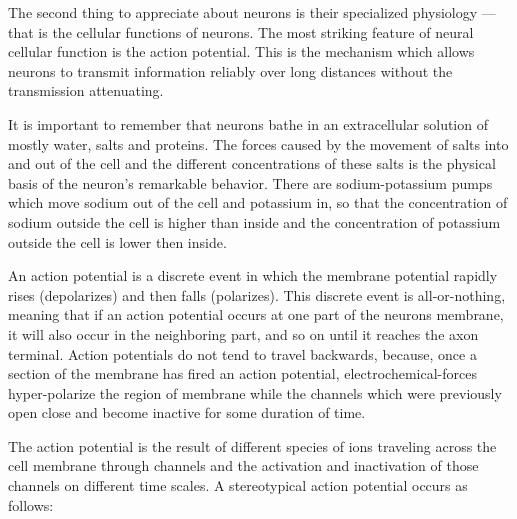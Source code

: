 \documentclass[12pt,a4paper]{report}
\begin{document}
The second thing to appreciate about neurons is their specialized physiology — that is the cellular functions of neurons. The most striking feature of neural cellular function is the action potential. This is the mechanism which allows neurons to transmit information reliably over long distances without the transmission attenuating.

\vspace{10pt}
It is important to remember that neurons bathe in an extracellular solution of mostly water, salts and proteins. The forces caused by the movement of salts into and out of the cell and the different concentrations of these salts is the physical basis of the neuron’s remarkable behavior. There are sodium-potassium pumps which move sodium out of the cell and potassium in, so that the concentration of sodium outside the cell is higher than inside and the concentration of potassium outside the cell is lower then inside.

\vspace{10pt}
An action potential is a discrete event in which the membrane potential rapidly rises (depolarizes) and then falls (polarizes). This discrete event is all-or-nothing, meaning that if an action potential occurs at one part of the neurons membrane, it will also occur in the neighboring part, and so on until it reaches the axon terminal. Action potentials do not tend to travel backwards, because, once a section of the membrane has fired an action potential, electrochemical-forces hyper-polarize the region of membrane while the channels which were previously open close and become inactive for some duration of time.

\vspace{10pt}
The action potential is the result of different species of ions traveling across the cell membrane through channels and the activation and inactivation of those channels on different time scales. A stereotypical action potential occurs as follows:
\end{document}
